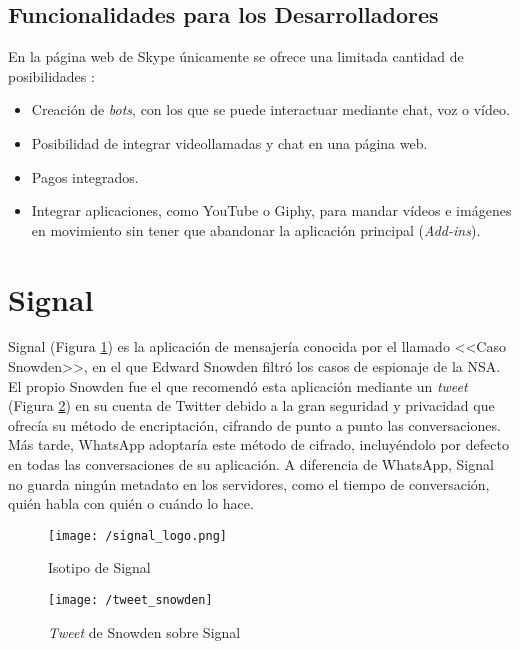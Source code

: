 \newpage

\subsection{Funcionalidades para los Desarrolladores}
En la página web de Skype únicamente se ofrece una limitada cantidad de posibilidades \cite{Skype2017a}:

\begin{itemize}
	\item Creación de \textit{bots}, con los que se puede interactuar mediante chat, voz o vídeo.
	\item Posibilidad de integrar videollamadas y chat en una página web.
	\item Pagos integrados.
	\item Integrar aplicaciones, como YouTube o Giphy, para mandar vídeos e imágenes en movimiento sin tener que abandonar la aplicación principal (\textit{Add-ins}).
\end{itemize}

\section{Signal}
\label{sec:signal}

Signal (Figura \ref{fig:signal}) es la aplicación de mensajería conocida por el llamado <<Caso Snowden>>, en el que Edward Snowden filtró los casos de espionaje de la \acf{NSA}. El propio Snowden fue el que recomendó esta aplicación mediante un \textit{tweet} (Figura \ref{fig:tweetsnowden}) en su cuenta de Twitter debido a la gran seguridad y privacidad que ofrecía su método de encriptación, cifrando de punto a punto las conversaciones. Más tarde, WhatsApp adoptaría este método de cifrado, incluyéndolo por defecto en todas las conversaciones de su aplicación. A diferencia de WhatsApp, Signal no guarda ningún metadato en los servidores, como el tiempo de conversación, quién habla con quién o cuándo lo hace.

\begin{figure}[!h]
	\begin{center}
		\texttt{[image: /signal\_logo.png]}
		\caption{Isotipo de Signal}
		\label{fig:signal}
	\end{center}
\end{figure}

\begin{figure}[!h]
	\begin{center}
		\texttt{[image: /tweet\_snowden]}
		\caption{\textit{Tweet} de Snowden sobre Signal}
		\label{fig:tweetsnowden}
	\end{center}
\end{figure}

